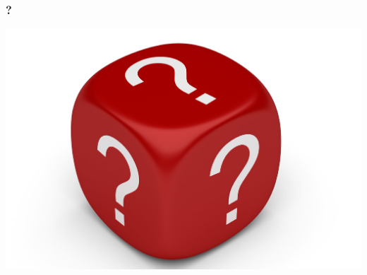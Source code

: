 \begin{frame}[fragile]
\frametitle{?}
\begin{center}
\includegraphics[height=0.24\textheight]{image/question.png}
\end{center}
\end{frame}
